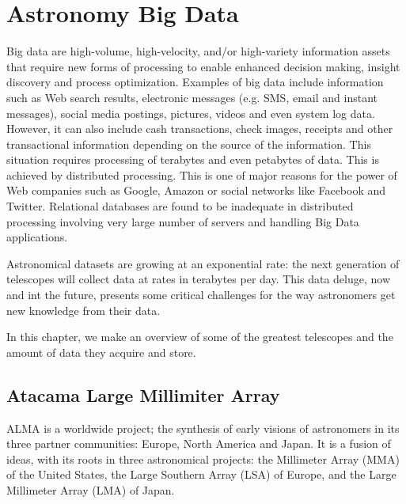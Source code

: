 \chapter{Astronomy Big Data}\label{theproblem}


Big data are high-volume, high-velocity, and/or high-variety information assets that require new forms of processing to enable enhanced decision making, insight discovery and process optimization. Examples of big data include information such as Web search results, electronic messages (e.g. SMS, email and instant messages), social media postings, pictures, videos and even system log data. However, it can also include cash transactions, check images, receipts and other transactional information depending on the source of the information. This situation requires processing of terabytes and even petabytes of data. This is achieved by distributed processing. This is one of major reasons for the power of Web companies such as
Google, Amazon or social networks like Facebook and Twitter. Relational databases are found to be inadequate in distributed processing involving very large number of servers and handling Big Data applications. \newline

Astronomical datasets are growing at an exponential rate: the next generation of telescopes will collect data at rates in terabytes per day. This data deluge, now and int the future, presents some critical challenges for the way astronomers get new knowledge from their data. \newline

In this chapter, we make an overview of some of the greatest telescopes and the amount of data they acquire and store.


\section{Atacama Large Millimiter Array}

ALMA is a worldwide project; the synthesis of early visions of astronomers in its three partner communities: Europe, North America and Japan. It is a fusion of ideas, with its roots in three astronomical projects: the Millimeter Array (MMA) of the United States, the Large Southern Array (LSA) of Europe, and the Large Millimeter Array (LMA) of Japan.\newline

